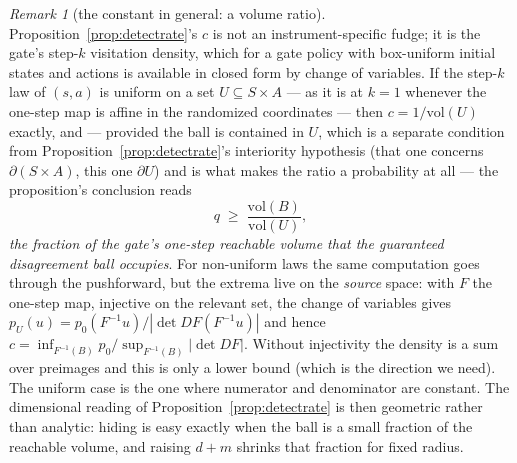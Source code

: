 \documentclass[11pt]{article}
\theoremstyle{definition}
\theoremstyle{remark}
\newtheorem{remark}{Remark}
\begin{document}
\begin{remark}[the constant in general: a volume ratio]
\label{rem:densitygeneral}
Proposition~\ref{prop:detectrate}'s $c$ is not an instrument-specific fudge; it is the gate's step-$k$ visitation density, which for a gate policy with box-uniform initial states and actions is available in closed form by change of variables. If the step-$k$ law of $(s,a)$ is uniform on a set $U \subseteq S \times A$ --- as it is at $k=1$ whenever the one-step map is affine in the randomized coordinates --- then $c = 1/\mathrm{vol}(U)$ exactly, and --- provided the ball is contained in $U$, which is a separate condition from Proposition~\ref{prop:detectrate}'s interiority hypothesis (that one concerns $\partial(S\times A)$, this one $\partial U$) and is what makes the ratio a probability at all --- the proposition's conclusion reads
\[
  q \;\geq\; \frac{\mathrm{vol}(B)}{\mathrm{vol}(U)},
\]
\emph{the fraction of the gate's one-step reachable volume that the guaranteed disagreement ball occupies}. For non-uniform laws the same computation goes through the pushforward, but the extrema live on the \emph{source} space: with $F$ the one-step map, injective on the relevant set, the change of variables gives $p_U(u) = p_0(F^{-1}u)/|\det DF(F^{-1}u)|$ and hence $c = \inf_{F^{-1}(B)} p_0 \big/ \sup_{F^{-1}(B)} |\det DF|$. Without injectivity the density is a sum over preimages and this is only a lower bound (which is the direction we need). The uniform case is the one where numerator and denominator are constant. The dimensional reading of Proposition~\ref{prop:detectrate} is then geometric rather than analytic: hiding is easy exactly when the ball is a small fraction of the reachable volume, and raising $d+m$ shrinks that fraction for fixed radius.
\end{remark}
\end{document}
